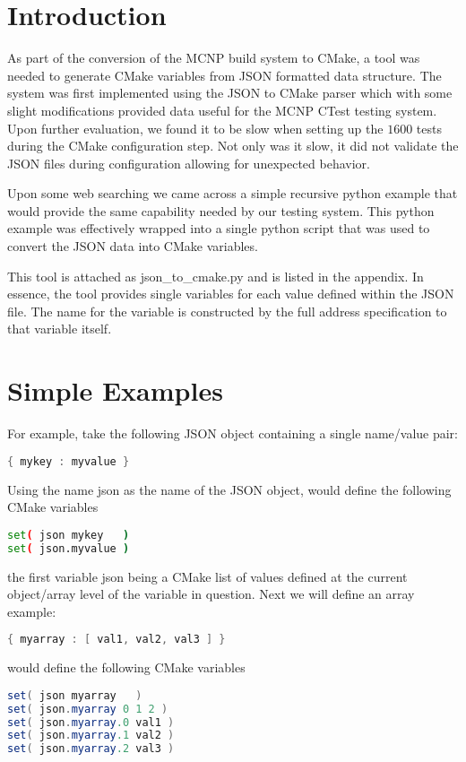 \documentclass[12pt]{article}
\begin{document}
\section{Introduction}

As part of the conversion of the MCNP build system to CMake, a tool was needed to generate CMake variables
from JSON formatted data structure.  The system was first implemented using the JSON to CMake parser \cite{jsoncmake} which with some slight modifications provided data useful for the MCNP CTest testing system.  Upon further evaluation, we found it to be slow when setting up the $1600$ tests during the CMake configuration step.  Not only was it slow, it did not validate the JSON files during configuration allowing for unexpected behavior.   

Upon some web searching we came across a simple recursive python example that would provide the same capability needed by our testing system\cite{flatten}.  This python example was effectively wrapped into a single python script that was used to convert the JSON data into CMake variables.

This tool is attached as json\_to\_cmake.py and is listed in the appendix.  In essence, the tool provides single variables for each value defined within the JSON file. The name for the variable is constructed by the full address specification to that variable itself.

\section{Simple Examples}
For example, take the following JSON object containing a single name/value pair:
\begin{lstlisting}[language=java,basicstyle=\tiny,frame=single,columns=fullflexible]
{ mykey : myvalue }
\end{lstlisting}

Using the name json as the name of the JSON object, would define the following CMake variables
\begin{lstlisting}[language=bash,basicstyle=\tiny,frame=single,columns=fullflexible]
set( json mykey   ) 
set( json.myvalue )
\end{lstlisting}
the first variable json being a CMake list of values defined at the current object/array level of the variable in question.
Next we will define an array example:
\begin{lstlisting}[language=java,basicstyle=\tiny,frame=single,columns=fullflexible]
{ myarray : [ val1, val2, val3 ] }
\end{lstlisting}
would define the following CMake variables
\begin{lstlisting}[language=java,basicstyle=\tiny,frame=single,columns=fullflexible]
set( json myarray   ) 
set( json.myarray 0 1 2 )
set( json.myarray.0 val1 ) 
set( json.myarray.1 val2 ) 
set( json.myarray.2 val3 ) 
\end{lstlisting}
\end{document}

